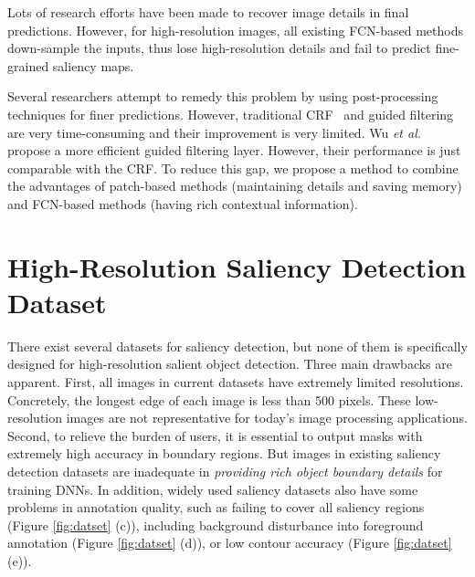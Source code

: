 Lots of research efforts have been made to recover image details in final predictions. However, for high-resolution images, all existing FCN-based methods down-sample the inputs, thus lose high-resolution details and fail to predict fine-grained saliency maps. 

Several researchers attempt to remedy this problem by using post-processing techniques for finer predictions. However, traditional CRF~\cite{krahenbuhl2011efficient} and guided filtering are very time-consuming and their improvement is very limited. Wu \emph{et al.} \cite{wu2018fast} propose a more efficient guided filtering layer. However, their performance is just comparable with the CRF. To reduce this gap, we propose a method to combine the advantages of patch-based methods (maintaining details and saving memory) and FCN-based methods (having rich contextual information).
\section{High-Resolution Saliency Detection Dataset}\label{dataset}

There exist several datasets for saliency detection, but none of them is specifically designed for high-resolution salient object detection. Three main drawbacks are apparent. First, all images in current datasets have extremely limited resolutions. Concretely, the longest edge of each image is less than 500 pixels. These low-resolution images are not representative for today's image processing applications. Second, to relieve the burden of users, it is essential to output masks with extremely high accuracy in boundary regions. But images in existing saliency detection datasets are inadequate in \emph{providing rich object boundary details} for training DNNs. In addition, widely used saliency datasets also have some problems in annotation quality, such as failing to cover all saliency regions (Figure \ref{fig:datset} (c)), including background disturbance into foreground annotation (Figure \ref{fig:datset} (d)), or low contour accuracy (Figure \ref{fig:datset} (e)).

